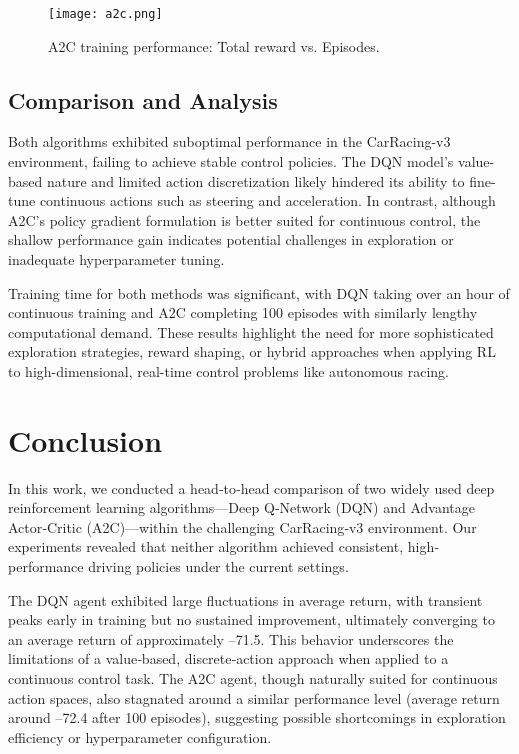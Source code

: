 \documentclass[conference]{IEEEtran}
\begin{document}
\begin{figure}[h]
    \centering
    \texttt{[image: a2c.png]}
    \caption{A2C training performance: Total reward vs. Episodes.}
    \label{fig:a2c_results}
\end{figure}

\subsection{Comparison and Analysis}
Both algorithms exhibited suboptimal performance in the CarRacing-v3 environment, failing to achieve stable control policies. The DQN model's value-based nature and limited action discretization likely hindered its ability to fine-tune continuous actions such as steering and acceleration. In contrast, although A2C's policy gradient formulation is better suited for continuous control, the shallow performance gain indicates potential challenges in exploration or inadequate hyperparameter tuning.

Training time for both methods was significant, with DQN taking over an hour of continuous training and A2C completing 100 episodes with similarly lengthy computational demand. These results highlight the need for more sophisticated exploration strategies, reward shaping, or hybrid approaches when applying RL to high-dimensional, real-time control problems like autonomous racing.

\section*{Conclusion}

In this work, we conducted a head‐to‐head comparison of two widely used deep reinforcement learning algorithms—Deep Q‐Network (DQN) and Advantage Actor‐Critic (A2C)—within the challenging CarRacing‐v3 environment. Our experiments revealed that neither algorithm achieved consistent, high‐performance driving policies under the current settings. 

The DQN agent exhibited large fluctuations in average return, with transient peaks early in training but no sustained improvement, ultimately converging to an average return of approximately –71.5. This behavior underscores the limitations of a value‐based, discrete‐action approach when applied to a continuous control task. The A2C agent, though naturally suited for continuous action spaces, also stagnated around a similar performance level (average return around –72.4 after 100 episodes), suggesting possible shortcomings in exploration efficiency or hyperparameter configuration.
\end{document}
